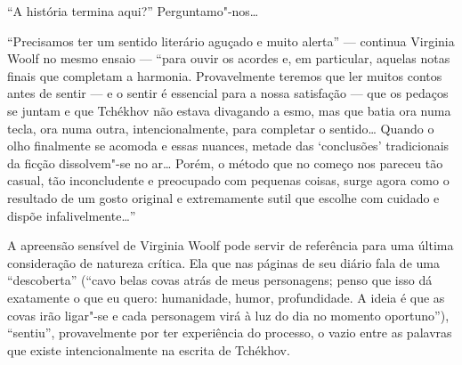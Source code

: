 ``A história termina aqui?'' Perguntamo"-nos\ldots{}

``Precisamos ter um sentido
literário aguçado e muito alerta'' --- continua Virginia Woolf no mesmo ensaio --- ``para
ouvir os acordes e, em particular, aquelas notas finais que completam a
harmonia. Provavelmente teremos que ler muitos contos antes de sentir ---
e o sentir é essencial para a nossa satisfação --- que os pedaços se
juntam e que Tchékhov não estava divagando a esmo, mas que batia ora
numa tecla, ora numa outra, intencionalmente, para completar o
sentido\ldots{} Quando o olho finalmente se acomoda e essas nuances, metade
das `conclusões' tradicionais da ficção dissolvem"-se no ar\ldots{} Porém, o
método que no começo nos pareceu tão casual, tão inconcludente e
preocupado com pequenas coisas, surge agora como o resultado de um gosto
original e extremamente sutil que escolhe com cuidado e dispõe
infalivelmente\ldots{}''

A apreensão sensível de Virginia Woolf pode servir de referência para
uma última consideração de natureza crítica. Ela que nas páginas de seu
diário fala de uma ``descoberta'' (``cavo belas covas atrás de meus
personagens; penso que isso dá exatamente o que eu quero: humanidade,
humor, profundidade. A ideia é que as covas irão ligar"-se e cada
personagem virá à luz do dia no momento oportuno''), ``sentiu'',
provavelmente por ter experiência do processo, o vazio entre as palavras
que existe intencionalmente na escrita de Tchékhov.

